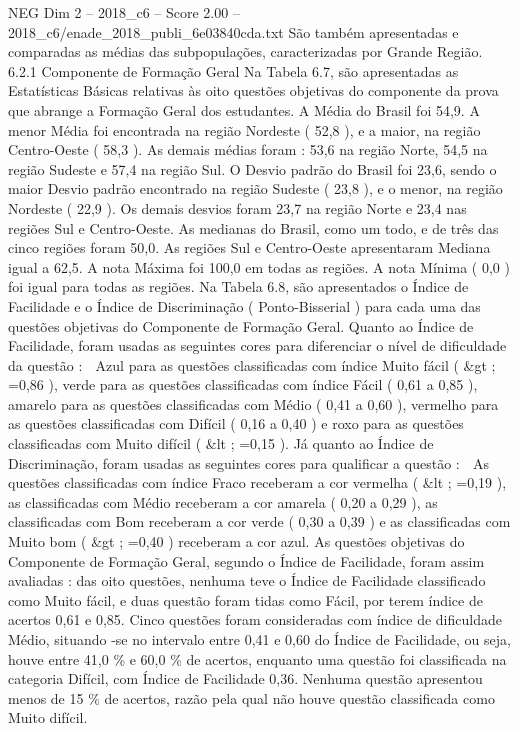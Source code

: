 \begin{textsample}{NEG Dim 2 – 2018\_c6 – Score 2.00 – 2018\_c6/enade\_2018\_publi\_6e03840cda.txt}
São também apresentadas e comparadas as médias das subpopulações, caracterizadas por Grande Região. 6.2.1 Componente de Formação Geral Na Tabela 6.7, são apresentadas as Estatísticas Básicas relativas às oito questões objetivas do componente da prova que abrange a Formação Geral dos estudantes.
A Média do Brasil foi 54,9.
A menor Média foi encontrada na região Nordeste ( 52,8 ), e a maior, na região Centro-Oeste ( 58,3 ).
As demais médias foram : 53,6 na região Norte, 54,5 na região Sudeste e 57,4 na região Sul.
O Desvio padrão do Brasil foi 23,6, sendo o maior Desvio padrão encontrado na região Sudeste ( 23,8 ), e o menor, na região Nordeste ( 22,9 ).
Os demais desvios foram 23,7 na região Norte e 23,4 nas regiões Sul e Centro-Oeste.
As medianas do Brasil, como um todo, e de três das cinco regiões foram 50,0.
As regiões Sul e Centro-Oeste apresentaram Mediana igual a 62,5.
A nota Máxima foi 100,0 em todas as regiões.
A nota Mínima ( 0,0 ) foi igual para todas as regiões.
Na Tabela 6.8, são apresentados o Índice de Facilidade e o Índice de Discriminação ( Ponto-Bisserial ) para cada uma das questões objetivas do Componente de Formação Geral.
Quanto ao Índice de Facilidade, foram usadas as seguintes cores para diferenciar o nível de dificuldade da questão :  Azul para as questões classificadas com índice Muito fácil ( \&gt ; =0,86 ), verde para as questões classificadas com índice Fácil ( 0,61 a 0,85 ), amarelo para as questões classificadas com Médio ( 0,41 a 0,60 ), vermelho para as questões classificadas com Difícil ( 0,16 a 0,40 ) e roxo para as questões classificadas com Muito difícil ( \&lt ; =0,15 ).
Já quanto ao Índice de Discriminação, foram usadas as seguintes cores para qualificar a questão :  As questões classificadas com índice Fraco receberam a cor vermelha ( \&lt ; =0,19 ), as classificadas com Médio receberam a cor amarela ( 0,20 a 0,29 ), as classificadas com Bom receberam a cor verde ( 0,30 a 0,39 ) e as classificadas com Muito bom ( \&gt ; =0,40 ) receberam a cor azul.
As questões objetivas do Componente de Formação Geral, segundo o Índice de Facilidade, foram assim avaliadas : das oito questões, nenhuma teve o Índice de Facilidade classificado como Muito fácil, e duas questão foram tidas como Fácil, por terem índice de acertos 0,61 e 0,85.
Cinco questões foram consideradas com índice de dificuldade Médio, situando -se no intervalo entre 0,41 e 0,60 do Índice de Facilidade, ou seja, houve entre 41,0 \% e 60,0 \% de acertos, enquanto uma questão foi classificada na categoria Difícil, com Índice de Facilidade 0,36.
Nenhuma questão apresentou menos de 15 \% de acertos, razão pela qual não houve questão classificada como Muito difícil.

\end{textsample}
